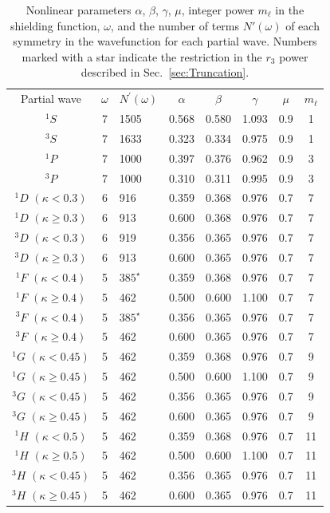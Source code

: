 \documentclass[preprint,showpacs,showkeys,preprintnumbers,amsmath,amssymb,longbibliography,pra,aps]{revtex4-1}
\begin{document}
\begin{table}[H]
  \centering
  \begin{ruledtabular}
    \begin{tabular}{cclccccc}
	Partial wave & $\omega$ & $N^\prime(\omega)$ & $\alpha$ & $\beta$ & $\gamma$ & $\mu$ & $m_\ell$ \\
	\colrule
	$^1S$                      & 7 & 1505        & 0.568 & 0.580 & 1.093 & 0.9 & 1 \\
	$^3S$                      & 7 & 1633        & 0.323 & 0.334 & 0.975 & 0.9 & 1 \\
	$^1P$                      & 7 & 1000        & 0.397 & 0.376 & 0.962 & 0.9 & 3 \\
	$^3P$                      & 7 & 1000        & 0.310 & 0.311 & 0.995 & 0.9 & 3 \\
	$^1D$ $(\kappa < 0.3)$     & 6 & 916         & 0.359 & 0.368 & 0.976 & 0.7 & 7 \\
	$^1D$ $(\kappa \geq 0.3)$  & 6 & 913         & 0.600 & 0.368 & 0.976 & 0.7 & 7 \\
	$^3D$ $(\kappa < 0.3)$     & 6 & 919         & 0.356 & 0.365 & 0.976 & 0.7 & 7 \\
	$^3D$ $(\kappa \geq 0.3)$  & 6 & 913         & 0.600 & 0.365 & 0.976 & 0.7 & 7 \\
	$^1F$ $(\kappa < 0.4)$     & 5 & $385^\star$ & 0.359 & 0.368 & 0.976 & 0.7 & 7 \\
	$^1F$ $(\kappa \geq 0.4)$  & 5 & 462         & 0.500 & 0.600 & 1.100 & 0.7 & 7 \\
	$^3F$ $(\kappa < 0.4)$     & 5 & $385^\star$ & 0.356 & 0.365 & 0.976 & 0.7 & 7 \\
    $^3F$ $(\kappa \geq 0.4)$  & 5 & 462         & 0.600 & 0.365 & 0.976 & 0.7 & 7 \\
	$^1G$ $(\kappa < 0.45)$    & 5 & 462         & 0.359 & 0.368 & 0.976 & 0.7 & 9 \\
    $^1G$ $(\kappa \geq 0.45)$ & 5 & 462         & 0.500 & 0.600 & 1.100 & 0.7 & 9 \\
	$^3G$ $(\kappa < 0.45)$    & 5 & 462         & 0.356 & 0.365 & 0.976 & 0.7 & 9 \\
    $^3G$ $(\kappa \geq 0.45)$ & 5 & 462         & 0.600 & 0.365 & 0.976 & 0.7 & 9 \\
	$^1H$ $(\kappa < 0.5)$     & 5 & 462         & 0.359 & 0.368 & 0.976 & 0.7 & 11 \\
	$^1H$ $(\kappa \geq 0.5)$  & 5 & 462         & 0.500 & 0.600 & 1.100 & 0.7 & 11 \\
	$^3H$ $(\kappa < 0.45)$    & 5 & 462         & 0.356 & 0.365 & 0.976 & 0.7 & 11 \\
    $^3H$ $(\kappa \geq 0.45)$ & 5 & 462         & 0.600 & 0.365 & 0.976 & 0.7 & 11 \\
	\end{tabular}
  \end{ruledtabular}
  \caption{Nonlinear parameters $\alpha$, $\beta$, $\gamma$, $\mu$, integer power $m_\ell$
in the shielding function, $\omega$, and the number of terms $N'(\omega)$ of each symmetry
in the wavefunction for each partial wave. Numbers marked with a star indicate the
restriction in the $r_3$ power described in Sec.~\ref{sec:Truncation}.}
  \label{tab:Nonlinear}
\end{table}	
\end{document}
